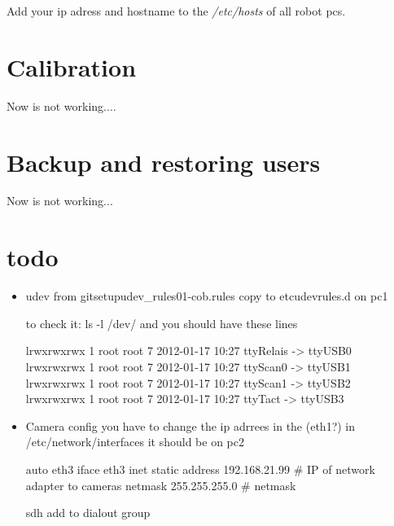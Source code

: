 Add your ip adress and hostname to the \textit{/etc/hosts} of all robot pcs.


\section{Calibration}
Now is not working....
\section{Backup and restoring users}   
Now is not working...    

\section{todo}
\begin{itemize}
\item {udev from git\/setup\/udev\_rules\/01-cob.rules copy to \/etc\/udev\/rules.d on pc1}

to check it: ls -l /dev/ and you should have these lines

lrwxrwxrwx 1 root root           7 2012-01-17 10:27 ttyRelais -> ttyUSB0\\
lrwxrwxrwx 1 root root           7 2012-01-17 10:27 ttyScan0 -> ttyUSB1\\
lrwxrwxrwx 1 root root           7 2012-01-17 10:27 ttyScan1 -> ttyUSB2\\
lrwxrwxrwx 1 root root           7 2012-01-17 10:27 ttyTact -> ttyUSB3\\



\item {Camera config you have to change the ip adrrees in the (eth1?) in /etc/network/interfaces it should be on pc2}


auto eth3
iface eth3 inet static
address 192.168.21.99   \# IP of network adapter to cameras
netmask 255.255.255.0   \# netmask

sdh add to dialout group

\end{itemize}